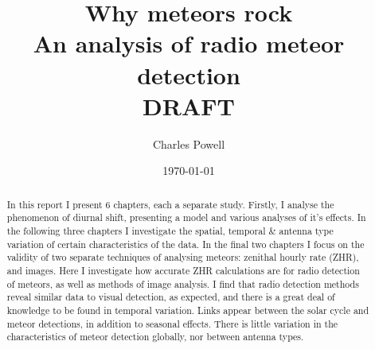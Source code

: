 \documentclass[a4paper,10pt,notitlepage, twocolumn]{report}
\title{\huge Why meteors rock \\ \large An analysis of radio meteor detection \\ \vspace{1em} \huge {\bf DRAFT}}
\author{Charles Powell}
\begin{document}
	

\begin{titlingpage}
\date{\today}
\maketitle

\vspace{10em}
\begin{abstract}
	In this report I present 6 chapters, each a separate study. Firstly, I analyse the phenomenon of diurnal shift, presenting a model and various analyses of it's effects. In the following three chapters I investigate the spatial, temporal \& antenna type variation of certain characteristics of the data. In the final two chapters I focus on the validity of two separate techniques of analysing meteors: zenithal hourly rate (ZHR), and images. Here I investigate how accurate ZHR calculations are for radio detection of meteors, as well as methods of image analysis. I find that radio detection methods reveal similar data to visual detection, as expected, and there is a great deal of knowledge to be found in temporal variation. Links appear between the solar cycle and meteor detections, in addition to seasonal effects. There is little variation in the characteristics of meteor detection globally, nor between antenna types.
\end{abstract}
\end{titlingpage}

\tableofcontents










\onecolumn

\begin{appendices}

\end{appendices}
\printbibliography
\end{document}
